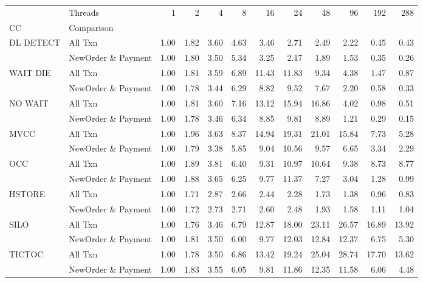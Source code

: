 \begin{tabular}{llrrrrrrrrrr}
\toprule
       & Threads &  1   &  2   &  4   &  8   &   16  &   24  &   48  &   96  &   192 &   288 \\
CC & Comparison &      &      &      &      &       &       &       &       &       &       \\
\midrule
DL DETECT & All Txn & 1.00 & 1.82 & 3.60 & 4.63 &  3.46 &  2.71 &  2.49 &  2.22 &  0.45 &  0.43 \\
       & NewOrder \& Payment & 1.00 & 1.80 & 3.50 & 5.34 &  3.25 &  2.17 &  1.89 &  1.53 &  0.35 &  0.26 \\
WAIT DIE & All Txn & 1.00 & 1.81 & 3.59 & 6.89 & 11.43 & 11.83 &  9.34 &  4.38 &  1.47 &  0.87 \\
       & NewOrder \& Payment & 1.00 & 1.78 & 3.44 & 6.29 &  8.82 &  9.52 &  7.67 &  2.20 &  0.58 &  0.33 \\
NO WAIT & All Txn & 1.00 & 1.81 & 3.60 & 7.16 & 13.12 & 15.94 & 16.86 &  4.02 &  0.98 &  0.51 \\
       & NewOrder \& Payment & 1.00 & 1.78 & 3.46 & 6.34 &  8.85 &  9.81 &  8.89 &  1.21 &  0.29 &  0.15 \\
MVCC & All Txn & 1.00 & 1.96 & 3.63 & 8.37 & 14.94 & 19.31 & 21.01 & 15.84 &  7.73 &  5.28 \\
       & NewOrder \& Payment & 1.00 & 1.79 & 3.38 & 5.85 &  9.04 & 10.56 &  9.57 &  6.65 &  3.34 &  2.29 \\
OCC & All Txn & 1.00 & 1.89 & 3.81 & 6.40 &  9.31 & 10.97 & 10.64 &  9.38 &  8.73 &  8.77 \\
       & NewOrder \& Payment & 1.00 & 1.88 & 3.65 & 6.25 &  9.77 & 11.37 &  7.27 &  3.04 &  1.28 &  0.99 \\
HSTORE & All Txn & 1.00 & 1.71 & 2.87 & 2.66 &  2.44 &  2.28 &  1.73 &  1.38 &  0.96 &  0.83 \\
       & NewOrder \& Payment & 1.00 & 1.72 & 2.73 & 2.71 &  2.60 &  2.48 &  1.93 &  1.58 &  1.11 &  1.04 \\
SILO & All Txn & 1.00 & 1.76 & 3.46 & 6.79 & 12.87 & 18.00 & 23.11 & 26.57 & 16.89 & 13.92 \\
       & NewOrder \& Payment & 1.00 & 1.81 & 3.50 & 6.00 &  9.77 & 12.03 & 12.84 & 12.37 &  6.75 &  5.30 \\
TICTOC & All Txn & 1.00 & 1.78 & 3.50 & 6.86 & 13.42 & 19.24 & 25.04 & 28.74 & 17.70 & 13.62 \\
       & NewOrder \& Payment & 1.00 & 1.83 & 3.55 & 6.05 &  9.81 & 11.86 & 12.35 & 11.58 &  6.06 &  4.48 \\
\bottomrule
\end{tabular}
